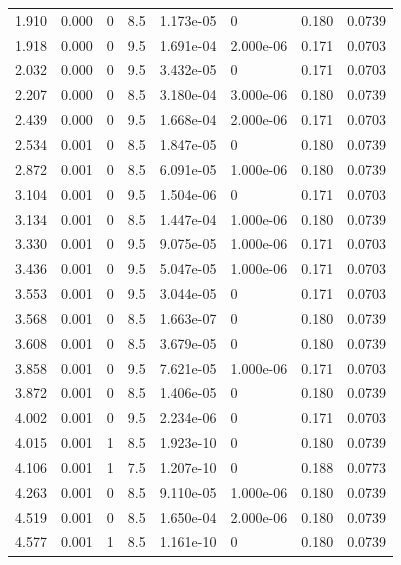 \documentclass[preview]{standalone}
\begin{document}
{{\begin{tabular}{L{1.2cm}C{1.2cm} C{0.3cm}C{0.5cm} C{1.4cm}C{1.4cm} C{1.4cm}C{1.4cm}}
  1.910  &  0.000  & 0     & 8.5 &  1.173e-05  & 0  & 0.180 &  0.0739   \\ 
  1.918  &  0.000  & 0     & 9.5 &  1.691e-04  & 2.000e-06  & 0.171 &  0.0703   \\ 
  2.032  &  0.000  & 0     & 9.5 &  3.432e-05  & 0  & 0.171 &  0.0703   \\ 
  2.207  &  0.000  & 0     & 8.5 &  3.180e-04  & 3.000e-06  & 0.180 &  0.0739   \\ 
  2.439  &  0.000  & 0     & 9.5 &  1.668e-04  & 2.000e-06  & 0.171 &  0.0703   \\ 
  2.534  &  0.001  & 0     & 8.5 &  1.847e-05  & 0  & 0.180 &  0.0739   \\ 
  2.872  &  0.001  & 0     & 8.5 &  6.091e-05  & 1.000e-06  & 0.180 &  0.0739   \\ 
  3.104  &  0.001  & 0     & 9.5 &  1.504e-06  & 0  & 0.171 &  0.0703   \\ 
  3.134  &  0.001  & 0     & 8.5 &  1.447e-04  & 1.000e-06  & 0.180 &  0.0739   \\ 
  3.330  &  0.001  & 0     & 9.5 &  9.075e-05  & 1.000e-06  & 0.171 &  0.0703   \\ 
  3.436  &  0.001  & 0     & 9.5 &  5.047e-05  & 1.000e-06  & 0.171 &  0.0703   \\ 
  3.553  &  0.001  & 0     & 9.5 &  3.044e-05  & 0  & 0.171 &  0.0703   \\ 
  3.568  &  0.001  & 0     & 8.5 &  1.663e-07  & 0  & 0.180 &  0.0739   \\ 
  3.608  &  0.001  & 0     & 8.5 &  3.679e-05  & 0  & 0.180 &  0.0739   \\ 
  3.858  &  0.001  & 0     & 9.5 &  7.621e-05  & 1.000e-06  & 0.171 &  0.0703   \\ 
  3.872  &  0.001  & 0     & 8.5 &  1.406e-05  & 0  & 0.180 &  0.0739   \\ 
  4.002  &  0.001  & 0     & 9.5 &  2.234e-06  & 0  & 0.171 &  0.0703   \\ 
  4.015  &  0.001  & 1     & 8.5 &  1.923e-10  & 0  & 0.180 &  0.0739   \\ 
  4.106  &  0.001  & 1     & 7.5 &  1.207e-10  & 0  & 0.188 &  0.0773   \\ 
  4.263  &  0.001  & 0     & 8.5 &  9.110e-05  & 1.000e-06  & 0.180 &  0.0739   \\ 
  4.519  &  0.001  & 0     & 8.5 &  1.650e-04  & 2.000e-06  & 0.180 &  0.0739   \\ 
  4.577  &  0.001  & 1     & 8.5 &  1.161e-10  & 0  & 0.180 &  0.0739   \\ 

\end{tabular}}}
\end{document}
